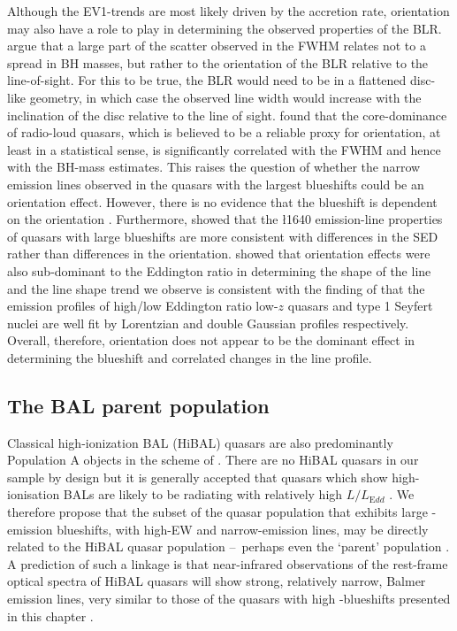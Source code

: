 Although the EV1-trends \citep{sulentic00b,shen14} are most likely driven by the accretion rate, orientation may also have a role to play in determining the observed properties of the BLR. 
\citet{shen14} argue that a large part of the scatter observed in the \hb FWHM relates not to a spread in BH masses, but rather to the orientation of the BLR relative to the line-of-sight.
For this to be true, the BLR would need to be in a flattened disc-like geometry, in which case the observed line width would increase with the inclination of the disc relative to the line of sight. 
\citet{brotherton15b} found that the core-dominance of radio-loud quasars, which is believed to be a reliable proxy for orientation, at least in a statistical sense, is significantly correlated with the \hb FWHM and hence with the BH-mass estimates. 
This raises the question of whether the narrow \ha emission lines observed in the quasars with the largest  blueshifts could be an orientation effect. 
However, there is no evidence that the  blueshift is dependent on the orientation \citep[inferred from the radio core-dominance;][]{richards11,runnoe14}. 
Furthermore, \citet{leighly04} showed that the \l1640 emission-line properties of quasars with large  blueshifts are more consistent with differences in the SED rather than differences in the orientation.
\citet{collin06} showed that orientation effects were also sub-dominant to the Eddington ratio in determining the shape of the \hb line and
the \ha line shape trend we observe is consistent with the finding of \citet{marziani03} that the \hb emission profiles of high/low Eddington ratio low-$z$ quasars and type 1 Seyfert nuclei are well fit by Lorentzian and double Gaussian profiles respectively.  
Overall, therefore, orientation does not appear to be the dominant effect in determining the  blueshift and correlated changes in the \ha line profile. 

\subsection{The BAL parent population}

Classical high-ionization BAL (HiBAL) quasars are also predominantly Population A objects in the scheme of \citet{sulentic00b}. 
There are no HiBAL quasars in our sample by design but it is generally accepted that quasars which show high-ionisation BALs are likely to be radiating with relatively high $L/L_{\mathrm Edd}$ \citep[e.g.][]{zhang14}. 
We therefore propose that the subset of the quasar population that exhibits large -emission blueshifts, with high-EW and narrow-\ha emission lines, may be directly related to the HiBAL quasar population \---\ perhaps even the `parent' population \citep{richards06conf}. 
A prediction of such a linkage is that near-infrared observations of the rest-frame optical spectra of HiBAL quasars will show strong, relatively narrow, Balmer emission lines, very similar to those of the quasars with high -blueshifts presented in this chapter \citep[see][for such a study]{runnoe13b}. 

